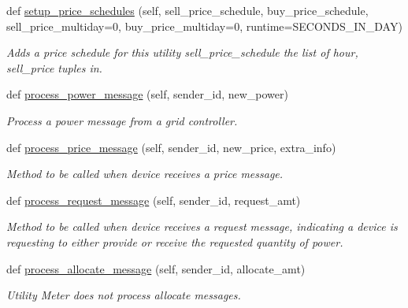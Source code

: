 \begin{DoxyCompactItemize}
def \hyperlink{class_build_1_1_objects_1_1utility__meter_1_1_utility_meter_a197ab2ab7f5abe14619a2ae15898b074}{setup\+\_\+price\+\_\+schedules} (self, sell\+\_\+price\+\_\+schedule, buy\+\_\+price\+\_\+schedule, sell\+\_\+price\+\_\+multiday=0, buy\+\_\+price\+\_\+multiday=0, runtime=S\+E\+C\+O\+N\+D\+S\+\_\+\+I\+N\+\_\+\+D\+AY)
\begin{DoxyCompactList}\small\item\em Adds a price schedule for this utility  sell\+\_\+price\+\_\+schedule the list of hour, sell\+\_\+price tuples in. \end{DoxyCompactList}\item 
def \hyperlink{class_build_1_1_objects_1_1utility__meter_1_1_utility_meter_a498d637ea147a783280bc68594ef0069}{process\+\_\+power\+\_\+message} (self, sender\+\_\+id, new\+\_\+power)
\begin{DoxyCompactList}\small\item\em Process a power message from a grid controller. \end{DoxyCompactList}\item 
def \hyperlink{class_build_1_1_objects_1_1utility__meter_1_1_utility_meter_a44b7bc4b09471d2529d4fef6c07abc42}{process\+\_\+price\+\_\+message} (self, sender\+\_\+id, new\+\_\+price, extra\+\_\+info)
\begin{DoxyCompactList}\small\item\em Method to be called when device receives a price message. \end{DoxyCompactList}\item 
def \hyperlink{class_build_1_1_objects_1_1utility__meter_1_1_utility_meter_ae450ec6bdd72caebb6163ae05490a1f8}{process\+\_\+request\+\_\+message} (self, sender\+\_\+id, request\+\_\+amt)
\begin{DoxyCompactList}\small\item\em Method to be called when device receives a request message, indicating a device is requesting to either provide or receive the requested quantity of power. \end{DoxyCompactList}\item 
def \hyperlink{class_build_1_1_objects_1_1utility__meter_1_1_utility_meter_a8b7c3c518352e0a41555a1a9e70b460c}{process\+\_\+allocate\+\_\+message} (self, sender\+\_\+id, allocate\+\_\+amt)
\begin{DoxyCompactList}\small\item\em Utility Meter does not process allocate messages. \end{DoxyCompactList}\item 

\end{DoxyCompactItemize}
